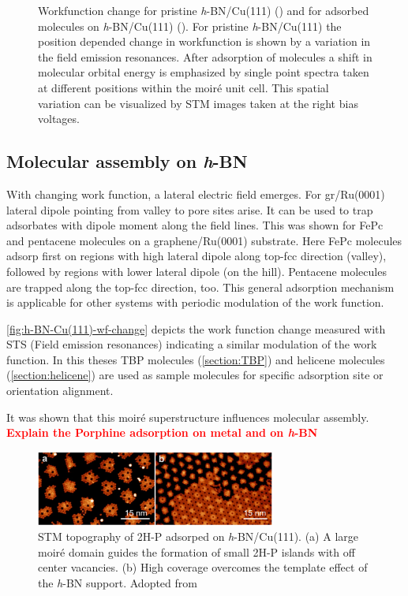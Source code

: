 \begin{figure}
{	\label{fig:h-BN-Cu(111)-wf-change-II}
	}
	\caption{Workfunction change for pristine \textit{h}-BN/Cu(111) () and for adsorbed molecules on \textit{h}-BN/Cu(111) (). For pristine \textit{h}-BN/Cu(111) the position depended change in workfunction is shown by a variation in the field emission resonances.  After adsorption of molecules a shift in molecular orbital energy is emphasized by single point spectra taken at different positions within the moir\'e unit cell. This spatial variation can be visualized by STM images taken at the right bias voltages.}
	\label{fig:h-BN-Cu(111)-wf-change}
\end{figure}

\FloatBarrier
\subsection{Molecular assembly on \textit{h}-BN}
\label{section:Mol-on-h-BN}
With changing work function, a lateral electric field emerges. For gr/Ru(0001) lateral dipole pointing from valley to pore sites arise.\cite{zhang_assembly_2011} It can be used to trap adsorbates with dipole moment along the field lines. This was shown for FePc and pentacene molecules on a graphene/Ru(0001) substrate. Here FePc molecules adsorp first on regions with high lateral dipole along top-fcc direction (valley), followed by regions with lower lateral dipole (on the hill). Pentacene molecules are trapped along the top-fcc direction, too.\cite{zhang_assembly_2011}  This general adsorption mechanism is applicable for other systems with periodic modulation of the work function.

\autoref{fig:h-BN-Cu(111)-wf-change} depicts the work function change measured with STS (Field emission resonances) indicating a similar modulation of the work function. In this theses TBP molecules (\autoref{section:TBP}) and helicene molecules (\autoref{section:helicene}) are used as sample molecules for specific adsorption site or orientation alignment.

It was shown that this moir\'e superstructure influences molecular assembly. 
\textcolor{red}{\textbf{Explain the Porphine adsorption on metal and on \textit{h}-BN}}

\begin{figure} \centering
	\includegraphics[width=0.7\textwidth]{./images/2H-P-hBN-Cu111-joshi}%
	\caption{STM topography of 2H-P adsorped on \textit{h}-BN/Cu(111). (a) A large moir\'e domain guides the formation of small 2H-P islands with off center vacancies. (b) High coverage overcomes the template effect of the \textit{h}-BN support. Adopted from \cite{diss-joshi}}
	\label{fig:2H-P-hBN-Cu111-joshi}
\end{figure}

